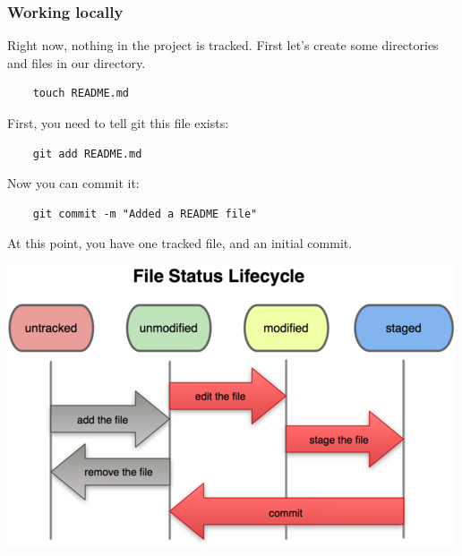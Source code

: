 %
%
\begin{frame}[fragile]
  \frametitle{
    Working locally
}


  Right now, nothing in the project is tracked. First let's create some directories and files in our directory.

  \begin{lstlisting}
    touch README.md
  \end{lstlisting}

  First, you need to tell git this file exists:

  \begin{lstlisting}
    git add README.md
  \end{lstlisting}

  Now you can commit it:

  \begin{lstlisting}
    git commit -m "Added a README file"
  \end{lstlisting}

  At this point, you have one tracked file, and an initial commit. 

\end{frame}

%
%
\begin{frame}[fragile]

  
  \begin{center}
    \includegraphics[scale=1.25]{./graphics/git_file_status_lifecycle.png}
  \end{center}

\end{frame}

